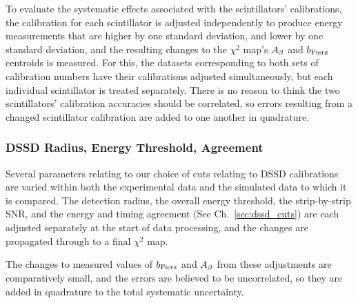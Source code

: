 To evaluate the systematic effects associated with the scintillators' calibrations, the calibration for each scintillator is adjusted independently to produce energy measurements that are higher by one standard deviation, and lower by one standard deviation, and the resulting changes to the $\chi^2$ map's $A_{\beta}$ and $b_{\mathrm{Fierz}}$ centroids is measured.  For this, the datasets corresponding to both sets of calibration numbers have their calibrations adjusted simultaneously, but each individual scintillator is treated separately.  There is no reason to think the two scintillators' calibration accuracies should be correlated, so errors resulting from a changed scintillator calibration are added to one another in quadrature.


\subsubsection{DSSD Radius, Energy Threshold, Agreement}
\label{section:bb1_systematics}
Several parameters relating to our choice of cuts relating to DSSD calibrations are varied within both the experimental data and the simulated data to which it is compared.  The detection radius, the overall energy threshold, the strip-by-strip SNR, and the energy and timing agreement (See Ch.~\ref{sec:dssd_cuts}) are each adjusted separately at the start of data processing, and the changes are propagated through to a final $\chi^2$ map.  

The changes to measured values of $b_{\mathrm{Fierz}}$ and $A_{\beta}$ from these adjustments are comparatively small, and the errors are believed to be uncorrelated, so they are added in quadrature to the total systematic uncertainty.


